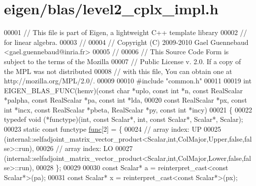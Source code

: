 \hypertarget{eigen_2blas_2level2__cplx__impl_8h_source}{}\section{eigen/blas/level2\+\_\+cplx\+\_\+impl.h}
\label{eigen_2blas_2level2__cplx__impl_8h_source}

\begin{DoxyCode}
00001 \textcolor{comment}{// This file is part of Eigen, a lightweight C++ template library}
00002 \textcolor{comment}{// for linear algebra.}
00003 \textcolor{comment}{//}
00004 \textcolor{comment}{// Copyright (C) 2009-2010 Gael Guennebaud <gael.guennebaud@inria.fr>}
00005 \textcolor{comment}{//}
00006 \textcolor{comment}{// This Source Code Form is subject to the terms of the Mozilla}
00007 \textcolor{comment}{// Public License v. 2.0. If a copy of the MPL was not distributed}
00008 \textcolor{comment}{// with this file, You can obtain one at http://mozilla.org/MPL/2.0/.}
00009 
00010 \textcolor{preprocessor}{#include "common.h"}
00011 
00019 \textcolor{keywordtype}{int} EIGEN\_BLAS\_FUNC(hemv)(\textcolor{keyword}{const} \textcolor{keywordtype}{char} *uplo, \textcolor{keyword}{const} \textcolor{keywordtype}{int} *n, \textcolor{keyword}{const} RealScalar *palpha, \textcolor{keyword}{const} RealScalar *pa, \textcolor{keyword}{
      const} \textcolor{keywordtype}{int} *lda,
00020                           \textcolor{keyword}{const} RealScalar *px, \textcolor{keyword}{const} \textcolor{keywordtype}{int} *incx, \textcolor{keyword}{const} RealScalar *pbeta, RealScalar *py, \textcolor{keyword}{
      const} \textcolor{keywordtype}{int} *incy)
00021 \{
00022   \textcolor{keyword}{typedef} void (*functype)(int, \textcolor{keyword}{const} Scalar*, int, \textcolor{keyword}{const} Scalar*, Scalar*, Scalar);
00023   \textcolor{keyword}{static} \textcolor{keyword}{const} functype \hyperlink{structfunc}{func}[2] = \{
00024     \textcolor{comment}{// array index: UP}
00025     (internal::selfadjoint\_matrix\_vector\_product<Scalar,int,ColMajor,Upper,false,false>::run),
00026     \textcolor{comment}{// array index: LO}
00027     (internal::selfadjoint\_matrix\_vector\_product<Scalar,int,ColMajor,Lower,false,false>::run),
00028   \};
00029 
00030   \textcolor{keyword}{const} Scalar* a = \textcolor{keyword}{reinterpret\_cast<}\textcolor{keyword}{const }Scalar*\textcolor{keyword}{>}(pa);
00031   \textcolor{keyword}{const} Scalar* x = \textcolor{keyword}{reinterpret\_cast<}\textcolor{keyword}{const }Scalar*\textcolor{keyword}{>}(px);

\end{DoxyCode}
